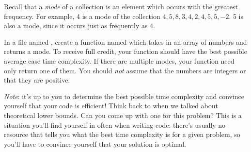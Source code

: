 \begin{progprob}

    Recall that a \emph{mode} of a collection is an element which occurs with the greatest
    frequency. For example, 4 is a mode of the collection $4, 5, 8, 3, 4, 2, 4, 5, 5, -2$.
    5 is also a mode, since it occurs just as frequently as 4.

    In a file named , create a function named
     which takes in an array of numbers and returns a
    mode. To receive full credit, your function should have the best possible
    average case time complexity. If there are multiple modes, your function need only
    return one of them. You should \emph{not} assume that the numbers are
    integers or that they are positive.

    \emph{Note}: it's up to you to determine the best possible time complexity and convince
    yourself that your code is efficient!
    Think back to when we talked about theoretical lower bounds. Can you come up with one
    for this problem? This is a situation you'll find yourself in often when writing code:
    there's usually no resource that tells you what the best time complexity is for a given
    problem, so you'll have to convince yourself that your solution is optimal.

    \begin{soln}
        \inputminted{python}{\thisdir/include-solution/mode.py}
    \end{soln}


\end{progprob}
